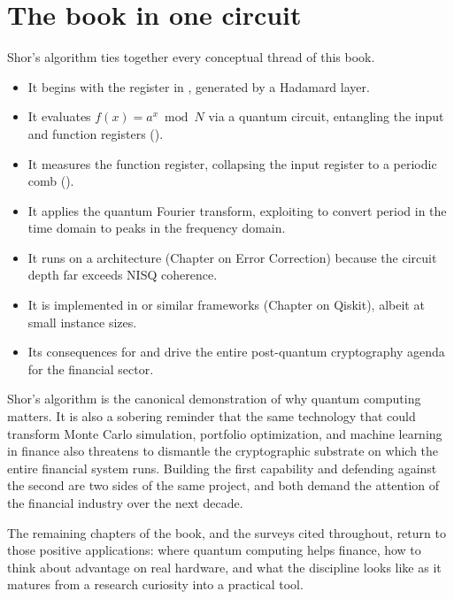 \section{The book in one circuit}

Shor's algorithm ties together every conceptual thread of this book.

\begin{itemize}
  \item It begins with the  register in , generated by a Hadamard layer.
  \item It evaluates $f(x) = a^x \bmod N$ via a quantum circuit, entangling the input and function registers ().
  \item It measures the function register, collapsing the input register to a periodic comb ().
  \item It applies the quantum Fourier transform, exploiting  to convert period in the time domain to peaks in the frequency domain.
  \item It runs on a  architecture (Chapter on Error Correction) because the circuit depth far exceeds NISQ coherence.
  \item It is implemented in  or similar frameworks (Chapter on Qiskit), albeit at small instance sizes.
  \item Its consequences for  and  drive the entire post-quantum cryptography agenda for the financial sector.
\end{itemize}

Shor's algorithm is the canonical demonstration of why quantum computing matters. It is also a sobering reminder that the same technology that could transform Monte Carlo simulation, portfolio optimization, and machine learning in finance also threatens to dismantle the cryptographic substrate on which the entire financial system runs. Building the first capability and defending against the second are two sides of the same project, and both demand the attention of the financial industry over the next decade.

The remaining chapters of the book, and the surveys cited throughout, return to those positive applications: where quantum computing helps finance, how to think about advantage on real hardware, and what the discipline looks like as it matures from a research curiosity into a practical tool.

\textsep
